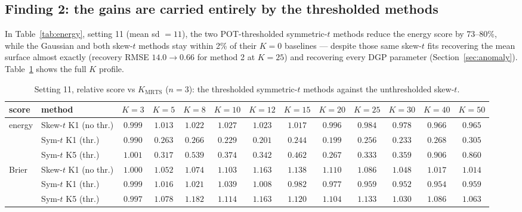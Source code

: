 \documentclass[11pt]{article}
\newcommand{\Kmrts}{K_{\mathrm{MRTS}}}
\begin{document}
\subsection{Finding 2: the gains are carried entirely by the thresholded
methods}

In Table~\ref{tab:energy}, setting 11 (mean sd $=11$), the two POT-thresholded
symmetric-$t$ methods reduce the energy score by 73--80\%, while the Gaussian
and both skew-$t$ methods stay within 2\% of their $K=0$ baselines --- despite
those same skew-$t$ fits recovering the mean surface almost exactly
(recovery RMSE $14.0 \to 0.66$ for method 2 at $K=25$) and recovering every DGP
parameter (Section~\ref{sec:anomaly}). Table~\ref{tab:perK} shows the full $K$
profile.

\begin{table}[ht]
\centering\small
\caption{Setting 11, relative score vs $\Kmrts$ ($n=3$): the thresholded
symmetric-$t$ methods against the unthresholded skew-$t$.}
\label{tab:perK}
\footnotesize
\setlength{\tabcolsep}{3.5pt}
\begin{tabular}{llccccccccccc}
\toprule
score & method & $K{=}3$ & $K{=}5$ & $K{=}8$ & $K{=}10$ & $K{=}12$ & $K{=}15$ & $K{=}20$ & $K{=}25$ & $K{=}30$ & $K{=}40$ & $K{=}50$ \\
\midrule
\multirow{3}{*}{energy}
 & Skew-$t$ K1 (no thr.)   & $0.999$ & $1.013$ & $1.022$ & $1.027$ & $1.023$ & $1.017$ & $0.996$ & $0.984$ & $0.978$ & $0.966$ & $0.965$ \\
 & Sym-$t$ K1 (thr.)       & $0.990$ & $\mathbf{0.263}$ & $0.266$ & $0.229$ & $0.201$ & $0.244$ & $\mathbf{0.199}$ & $0.256$ & $0.233$ & $0.268$ & $0.305$ \\
 & Sym-$t$ K5 (thr.)       & $1.001$ & $0.317$ & $0.539$ & $0.374$ & $0.342$ & $0.462$ & $\mathbf{0.267}$ & $0.333$ & $0.359$ & $0.906$ & $0.860$ \\
\midrule
\multirow{3}{*}{Brier}
 & Skew-$t$ K1 (no thr.)   & $1.000$ & $1.052$ & $1.074$ & $1.103$ & $\mathbf{1.163}$ & $1.138$ & $1.110$ & $1.086$ & $1.048$ & $1.017$ & $1.014$ \\
 & Sym-$t$ K1 (thr.)       & $0.999$ & $1.016$ & $1.021$ & $1.039$ & $1.008$ & $0.982$ & $0.977$ & $0.959$ & $0.952$ & $0.954$ & $0.959$ \\
 & Sym-$t$ K5 (thr.)       & $0.997$ & $1.078$ & $1.182$ & $1.114$ & $1.163$ & $1.120$ & $1.104$ & $1.133$ & $1.030$ & $1.086$ & $1.063$ \\
\bottomrule
\end{tabular}
\end{table}
\end{document}
